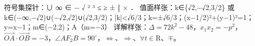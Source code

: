 \documentclass[fontset=none]{ctexart}
\begin{document}
符号集探针：∪ ∞ ∈ − √ ² ³ ≤ ≥ ± ‖ × ．
值面样张：k∈\{√2,−√2,3/2\} 或 k∈(−∞,−√2)∪(−√2,√2)∪(√2,3/2)；|k|<√6/3；k=±√6/3；(x−1/2)²+(y−1)²=1；y=x−1；m∈(−2,2)；A（m=−3）
详解样张：\(\Delta=72k^{2}-48\)，\(x_{1}x_{2}=-p^{2}\)，\(\overrightarrow{OA}\cdot\overrightarrow{OB}=-3\)，\(\angle AF_{2}B=90^{\circ}\)，\(\Leftrightarrow\)、\(\Rightarrow\)、\(\forall t\in\mathrm{R}\)、\(\mp\)。
\end{document}
